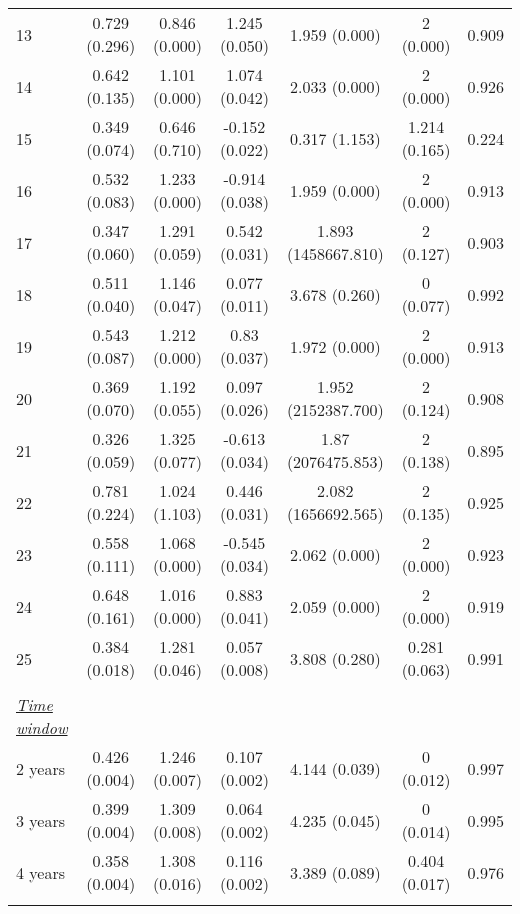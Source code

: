 \begin{tabular}{@{\extracolsep{5pt}} l cccccc}
13 & 0.729 (0.296) & 0.846 (0.000) & 1.245 (0.050) & 1.959 (0.000) & 2 (0.000) & 0.909 \\ 
14 & 0.642 (0.135) & 1.101 (0.000) & 1.074 (0.042) & 2.033 (0.000) & 2 (0.000) & 0.926 \\ 
15 & 0.349 (0.074) & 0.646 (0.710) & -0.152 (0.022) & 0.317 (1.153) & 1.214 (0.165) & 0.224 \\ 
16 & 0.532 (0.083) & 1.233 (0.000) & -0.914 (0.038) & 1.959 (0.000) & 2 (0.000) & 0.913 \\ 
17 & 0.347 (0.060) & 1.291 (0.059) & 0.542 (0.031) & 1.893 (1458667.810) & 2 (0.127) & 0.903 \\ 
18 & 0.511 (0.040) & 1.146 (0.047) & 0.077 (0.011) & 3.678 (0.260) & 0 (0.077) & 0.992 \\ 
19 & 0.543 (0.087) & 1.212 (0.000) & 0.83 (0.037) & 1.972 (0.000) & 2 (0.000) & 0.913 \\ 
20 & 0.369 (0.070) & 1.192 (0.055) & 0.097 (0.026) & 1.952 (2152387.700) & 2 (0.124) & 0.908 \\ 
21 & 0.326 (0.059) & 1.325 (0.077) & -0.613 (0.034) & 1.87 (2076475.853) & 2 (0.138) & 0.895 \\ 
22 & 0.781 (0.224) & 1.024 (1.103) & 0.446 (0.031) & 2.082 (1656692.565) & 2 (0.135) & 0.925 \\ 
23 & 0.558 (0.111) & 1.068 (0.000) & -0.545 (0.034) & 2.062 (0.000) & 2 (0.000) & 0.923 \\ 
24 & 0.648 (0.161) & 1.016 (0.000) & 0.883 (0.041) & 2.059 (0.000) & 2 (0.000) & 0.919 \\ 
25 & 0.384 (0.018) & 1.281 (0.046) & 0.057 (0.008) & 3.808 (0.280) & 0.281 (0.063) & 0.991 \\ 
 &   &   &   &   &   &  \\ 
\underline{{\it Time window}} &   &   &   &   &   &  \\ 
2 years & 0.426 (0.004) & 1.246 (0.007) & 0.107 (0.002) & 4.144 (0.039) & 0 (0.012) & 0.997 \\ 
3 years & 0.399 (0.004) & 1.309 (0.008) & 0.064 (0.002) & 4.235 (0.045) & 0 (0.014) & 0.995 \\ 
4 years & 0.358 (0.004) & 1.308 (0.016) & 0.116 (0.002) & 3.389 (0.089) & 0.404 (0.017) & 0.976 \\ 
\hline \\[-1.8ex] 
\end{tabular} 
